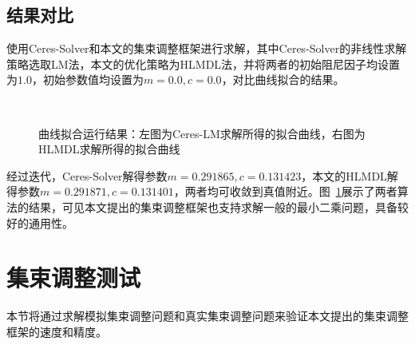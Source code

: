 \subsection{结果对比}

使用Ceres-Solver和本文的集束调整框架进行求解，其中Ceres-Solver的非线性求解策略选取LM法，本文的优化策略为HLMDL法，并将两者的初始阻尼因子均设置为$1.0$，初始参数值均设置为$m=0.0,c=0.0$，对比曲线拟合的结果。

\begin{figure}[htb!]
    \centering
    ~
    \caption{曲线拟合运行结果：左图为Ceres-LM求解所得的拟合曲线，右图为HLMDL求解所得的拟合曲线}
    \label{fig:curve}
\end{figure}

经过迭代，Ceres-Solver解得参数$m=0.291865,c=0.131423$，本文的HLMDL解得参数$m=0.291871,c=0.131401$，两者均可收敛到真值附近。图~\ref{fig:curve}展示了两者算法的结果，可见本文提出的集束调整框架也支持求解一般的最小二乘问题，具备较好的通用性。

\section{集束调整测试}

本节将通过求解模拟集束调整问题和真实集束调整问题来验证本文提出的集束调整框架的速度和精度。

